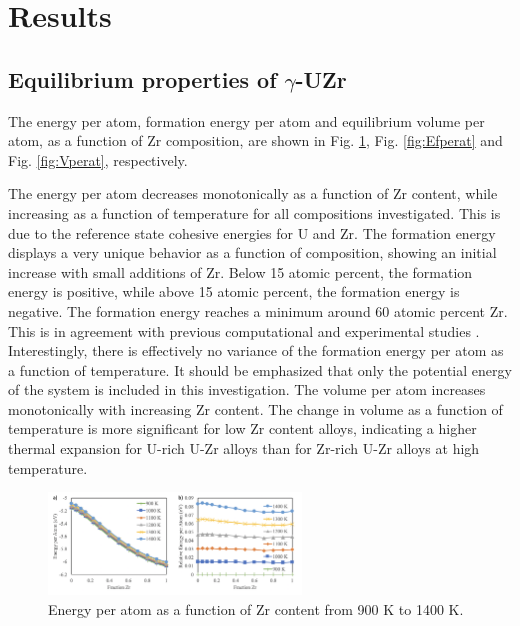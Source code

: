 \documentclass[review]{elsarticle}
\begin{document}
\section{Results}
\subsection{Equilibrium properties of $\gamma$-UZr}\label{sec:res1}

The energy per atom, formation energy per atom and equilibrium volume per atom, as a function of Zr composition, are shown in Fig. \ref{fig:Eperat}, Fig. \ref{fig:Efperat} and Fig. \ref{fig:Vperat}, respectively. 

The energy per atom decreases monotonically as a function of Zr content, while increasing as a function of temperature for all compositions investigated. This is due to the reference state cohesive energies for U and Zr. The formation energy displays a very unique behavior as a function of composition, showing an initial increase with small additions of Zr. Below 15 atomic percent, the formation energy is positive, while above 15 atomic percent, the formation energy is negative. The formation energy reaches a minimum around 60 atomic percent Zr. This is in agreement with previous computational and experimental studies \cite{moore2015}. Interestingly, there is effectively no variance of the formation energy per atom as a function of temperature. It should be emphasized that only the potential energy of the system is included in this investigation. The volume per atom increases monotonically with increasing Zr content. The change in volume as a function of temperature is more significant for low Zr content alloys, indicating a higher thermal expansion for U-rich U-Zr alloys than for Zr-rich U-Zr alloys at high temperature. 

\begin{figure}[!htp]
\begin{center}
\includegraphics[width=0.6\textwidth]{1_Eperat}
\end{center}
\caption{Energy per atom as a function of Zr content from 900 K to 1400 K. }
\label{fig:Eperat}
\end{figure}
\end{document}
